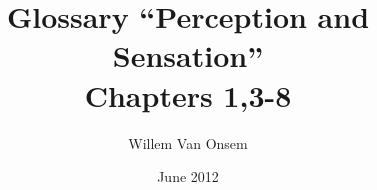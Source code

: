 \documentclass[a4paper,twocolumn]{article}
\title{Glossary ``Perception and Sensation''\\Chapters 1,3-8}
\author{Willem Van Onsem}
\date{June 2012}
\begin{document}
\maketitle

\glsaddall
\printglossaries
\end{document}

